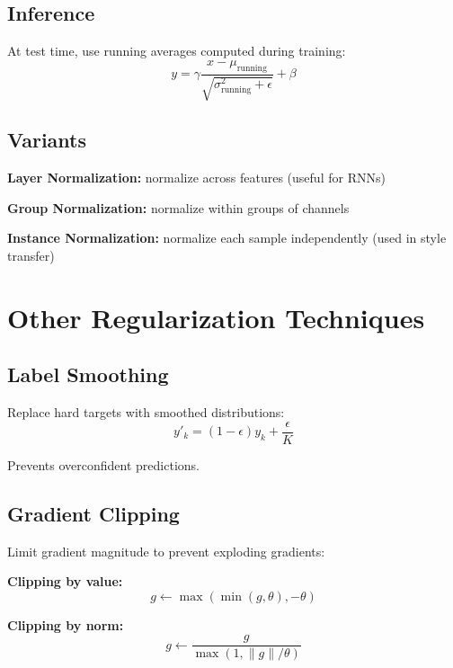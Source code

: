 \subsection{Inference}

At test time, use running averages computed during training:
\begin{equation}
y = \gamma \frac{x - \mu_{\text{running}}}{\sqrt{\sigma^2_{\text{running}} + \epsilon}} + \beta
\end{equation}

\subsection{Variants}

\textbf{Layer Normalization:} normalize across features (useful for RNNs)

\textbf{Group Normalization:} normalize within groups of channels

\textbf{Instance Normalization:} normalize each sample independently (used in style transfer)

\section{Other Regularization Techniques}
\label{sec:other-regularization}

\subsection{Label Smoothing}

Replace hard targets with smoothed distributions:
\begin{equation}
y'_k = (1 - \epsilon) y_k + \frac{\epsilon}{K}
\end{equation}

Prevents overconfident predictions.

\subsection{Gradient Clipping}

Limit gradient magnitude to prevent exploding gradients:

\textbf{Clipping by value:}
\begin{equation}
g \leftarrow \max(\min(g, \theta), -\theta)
\end{equation}

\textbf{Clipping by norm:}
\begin{equation}
g \leftarrow \frac{g}{\max(1, \|g\| / \theta)}
\end{equation}

